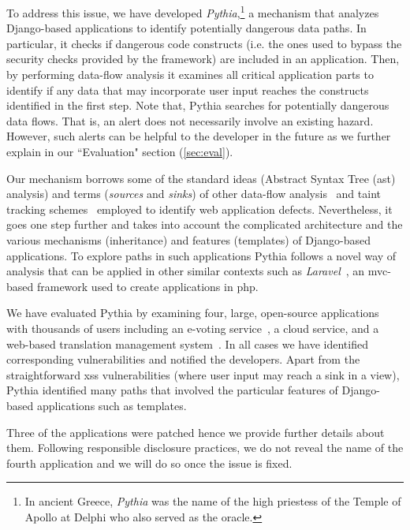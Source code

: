 To address this issue,
we have developed
{\it Pythia},\footnote{In
ancient Greece, {\it Pythia}
was the name of the high priestess
of the Temple of Apollo at Delphi
who also served as the oracle.}
a mechanism that analyzes
Django-based applications to identify
potentially dangerous data paths.
In particular,
it checks if dangerous code constructs
(i.e. the ones used to bypass the security checks provided by the framework)
are included in an application.
Then,
by performing data-flow analysis
it examines all critical application
parts to identify if any data that
may incorporate user input reaches
the constructs identified in the
first step.
Note that,
Pythia searches for potentially
dangerous data flows.
That is,
an alert does not necessarily involve
an existing hazard.
However,
such alerts can be helpful to
the developer in the future as we
further explain in our ``Evaluation"
section (\ref{sec:eval}).

Our mechanism borrows some of
the standard ideas
(Abstract Syntax Tree ({\sc ast}) analysis)
and terms
({\it sources} and {\it sinks})
of other data-flow
analysis~\cite{LL05, JKK06, DH14}
and taint tracking
schemes~\cite{VFJKKV07, PMP11, SLMS14}
employed to identify
web application defects.
Nevertheless,
it goes one step further and takes
into account the complicated architecture
and the various mechanisms
(inheritance) and features (templates)
of Django-based applications.
To explore paths in such applications
Pythia follows a novel way of
analysis that can be applied
in other similar contexts such
as {\it Laravel}~\cite{laravel},
an {\sc mvc}-based framework used to
create applications in {\sc php}.

We have evaluated Pythia by
examining four,
large,
open-source applications
with thousands of users including
an e-voting service~\cite{zeus-jets},
a cloud service,
and a web-based translation
management system~\cite{weblate}.
In all cases we have identified
corresponding vulnerabilities and
notified the developers.
Apart from the straightforward
{\sc xss} vulnerabilities
(where user input may reach a
sink in a view),
Pythia identified many paths
that involved the particular features of
Django-based applications such as templates.

Three of the applications were patched
hence we provide further details about them.
Following responsible disclosure practices,
we do not reveal the name of
the fourth application and we will
do so once the issue is fixed.

\vspace{-2.5mm}
